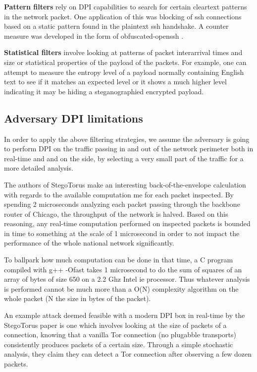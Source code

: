 \documentclass[11pt]{article} %
\begin{document}
\textbf{Pattern filters} rely on DPI capabilities to search for certain cleartext patterns in the network packet. One application of this was blocking of ssh connections based on a static pattern found in the plaintext ssh handshake. A counter measure was developed in the form of obfuscated-openssh \citep*{web:obfuscatedSSHRepo}.

\textbf{Statistical filters} involve looking at patterns of packet interarrival times and size or statistical properties of the payload of the packets. For example, one can attempt to measure the entropy level of a payload normally containing English text to see if it matches an expected level or it shows a much higher level indicating it may be hiding a steganographied encrypted payload.

\subsection{Adversary DPI limitations}
\label{subsec:dpiLimitations}

In order to apply the above filtering strategies, we assume the adversary is going to perform DPI on the traffic passing in and out of the network perimeter both in real-time and and on the side, by selecting a very small part of the traffic for a more detailed analysis.

The authors of StegoTorus  \citep*{stegotorus} make an interesting back-of-the-envelope calculation with regards to the available computation me for each packet inspected. By spending 2 microseconds analyzing each packet passing through the backbone router of Chicago, the throughput of the network is halved. Based on this reasoning, any real-time computation performed on inspected packets is bounded in time to something at the scale of 1 microsecond in order to not impact the performance of the whole national network significantly.

To ballpark how much computation can be done in that time, a C program compiled with g++  -Ofast takes 1 microsecond to do the sum of squares of an array of bytes of size 650 on a 2.2 Ghz Intel ie processor. Thus whatever analysis is performed cannot be much more than a O(N) complexity algorithm on the whole packet (N the size in bytes of the packet).

An example attack deemed feasible with a modern DPI box in real-time by the StegoTorus paper is one which involves looking at the size of packets of a connection, knowing that a vanilla Tor connection (no plugabble transports) consistently produces packets of a certain size. Through a simple stochastic analysis, they claim they can detect a Tor connection after observing a few dozen packets.
\end{document}
